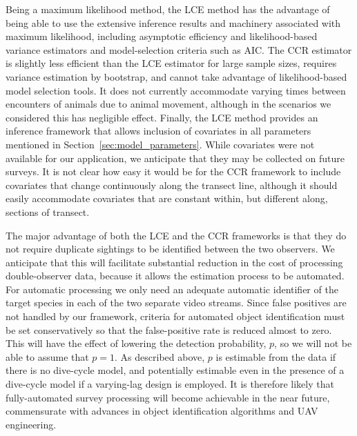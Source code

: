 \documentclass[useAMS, usenatbib, referee]{biom}\usepackage[]{graphicx}\usepackage[]{color}
\begin{document}
Being a maximum likelihood method, the LCE method has the advantage of being able to use the extensive inference results and machinery associated with maximum likelihood, including asymptotic efficiency and likelihood-based variance estimators and model-selection criteria such as AIC. The CCR estimator is slightly less efficient than the LCE estimator for large sample sizes, requires variance estimation by bootstrap, and cannot take advantage of likelihood-based model selection tools. It does not currently accommodate varying times between encounters of animals due to animal movement, although in the scenarios we considered this has negligible effect. Finally, the LCE method provides an inference framework that allows inclusion of covariates in all parameters mentioned in Section~\ref{sec:model_parameters}. While covariates were not available for our application, we anticipate that they may be collected on future surveys. It is not clear how easy it would be for the CCR framework to include covariates that change continuously along the transect line, although it should easily accommodate covariates that are constant within, but different along, sections of transect.


The major advantage of both the LCE and the CCR frameworks is that they do not require duplicate sightings to be identified between the two observers. We anticipate that this will facilitate substantial reduction in the cost of processing double-observer data, because it allows the estimation process to be automated. For automatic processing we only need an adequate automatic identifier of the target species in each of the two separate video streams. Since false positives are not handled by our framework, criteria for automated object identification must be set conservatively so that the false-positive rate is reduced almost to zero. This will have the effect of lowering the detection probability, $p$, so we will not be able to assume that $p=1$. As described above, $p$ is estimable from the data if there is no dive-cycle model, and potentially estimable even in the presence of a dive-cycle model if a varying-lag design is employed. It is therefore likely that fully-automated survey processing will become achievable in the near future, commensurate with advances in object identification algorithms and UAV engineering.
\end{document}
